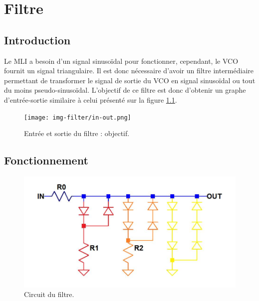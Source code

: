 \chapter{Filtre}
\section{Introduction}
Le MLI a besoin d'un signal sinusoïdal pour fonctionner, cependant, le VCO fournit un
signal triangulaire. Il est donc nécessaire d'avoir un filtre intermédiaire permettant
de transformer le signal de sortie du VCO en signal sinusoïdal ou tout du moins pseudo-sinusoïdal.
L'objectif de ce filtre est donc d'obtenir un graphe d'entrée-sortie similaire à
celui présenté sur la figure \ref{fig:filter-in-out}.

\begin{figure}[ht]
	\centering
	\texttt{[image: img-filter/in-out.png]}
	\caption{Entrée et sortie du filtre : objectif.}
	\label{fig:filter-in-out}
\end{figure}

\section{Fonctionnement}

\begin{figure}[ht]
	\centering
	\includegraphics[scale=0.3]{img-filter/circuit-colored.png}
	\caption{Circuit du filtre.}
	\label{fig:circuit-filtre}
\end{figure}

